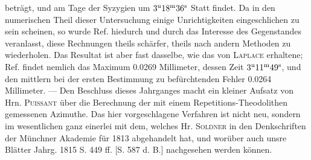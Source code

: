 beträgt, und am Tage der Syzygien um $3^{\rm u}18^{\rm m}36^{\rm s}$ Statt findet. Da in den numerischen Theil dieser Untersuchung einige Unrichtigkeiten eingeschlichen zu sein scheinen, so wurde Ref. hiedurch und durch das Interesse des Gegenstandes veranlasst, diese Rechnungen theils schärfer, theils nach andern Methoden zu wiederholen. Das Resultat ist aber fast dasselbe, wie das von \textsc{Laplace} erhaltene; Ref. findet nemlich das Maximum 0.0269 Millimeter, dessen Zeit $3^{\rm u}11^{\rm m}49^{\rm s}$, und den mittlern bei der ersten Bestimmung zu befürchtenden Fehler 0.0264 Millimeter. --- Den Beschluss dieses Jahrganges macht ein kleiner Aufsatz von Hrn. \textsc{Puissant} über die Berechnung der mit einem Repetitions-Theodolithen gemessenen Azimuthe. Das hier vorgeschlagene Verfahren ist nicht neu, sondern im wesentlichen ganz einerlei mit dem, welches Hr. \textsc{Soldner} in den Denkschriften der Münchner Akademie für 1813 abgehandelt hat, und worüber auch unsre Blätter Jahrg. 1815 S. 449 ff. [S. 587 d. B.] nachgesehen werden können.

\clearpage
\endgroup
